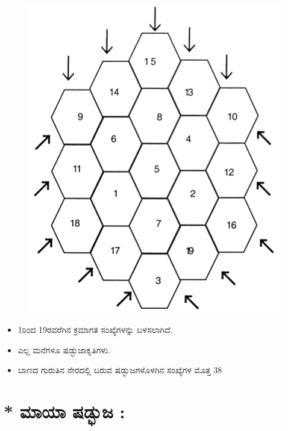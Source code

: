 \begin{figure}[H]
\includegraphics{src/figures/chap8/fig8-8.jpg}
\end{figure}
\begin{itemize}
	\item 1ರಿಂದ 19ರವರೆಗಿನ ಕ್ರಮಾಗತ ಸಂಖ್ಯೆಗಳನ್ನು ಬಳಸಲಾಗಿದೆ.\smallskip
	\item ಎಲ್ಲ ಮನೆಗಳೂ ಷಡ್ಭುಜಾಕೃತಿಗಳು.\smallskip
	\item ಬಾಣದ ಗುರುತಿನ ನೇರದಲ್ಲಿ ಬರುವ ಷಡ್ಭುಜಗಳೊಳಗಿನ ಸಂಖ್ಯೆಗಳ ಮೊತ್ತ $\boxed{38}$
\end{itemize}

\section*{* ಮಾಯಾ ಷಡ್ಭುಜ :}

